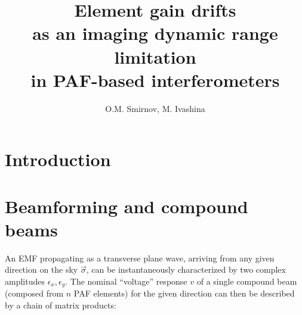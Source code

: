 \documentclass[10pt]{article}
\begin{document}
\title{Element gain drifts \\ as an imaging dynamic range limitation \\ in PAF-based
interferometers}


\author{O.M. Smirnov, M. Ivashina}

\maketitle

\section*{Introduction}


\section{Beamforming and compound beams}

An EMF propagating as a transverse plane wave, arriving from any given direction on the sky $\vec\sigma$, can be 
instantaneously characterized by two complex amplitudes $\epsilon_x,\epsilon_y$. The nominal ``voltage'' response $v$ of a single   
compound beam (composed from $n$ PAF elements) for the given direction can then be described by a chain of matrix products:
\end{document}
